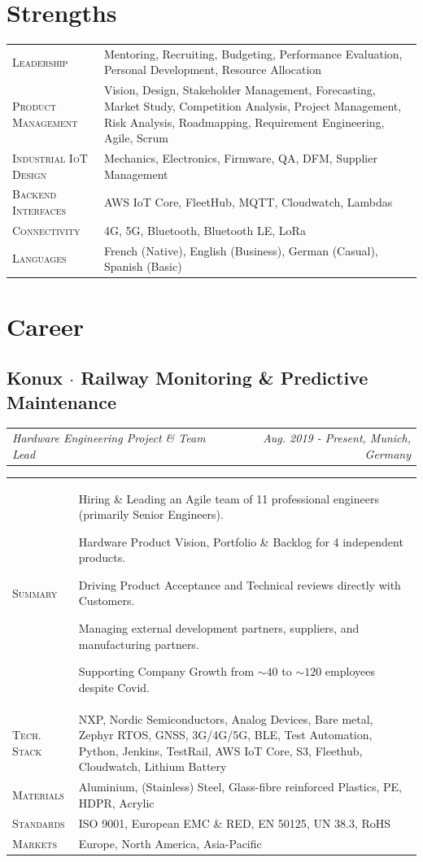 \documentclass[10pt,a4paper]{moderncv}
\newcommand*{\makecareersubsection}[5]{
    \subsection{#1 {\color{color2}$\cdot$ #2}}
    \addvspace{-0.5em}
    {\color{color2}
    \begin{tabularx}{\textwidth}{LR}
        {\itshape #3} & {\itshape #4, #5}
    \end{tabularx}}
    \par\addvspace{1em}
    }
\begin{document}
\section{Strengths}

\begin{tabularx}{\textwidth}{>{\scshape}l@{\hskip 3.5mm}L}
    Leadership & Mentoring, Recruiting, Budgeting, Performance Evaluation, Personal Development, Resource Allocation\\
    Product Management & Vision, Design, Stakeholder Management, Forecasting, Market Study, Competition Analysis, Project Management, Risk Analysis, Roadmapping, Requirement Engineering, Agile, Scrum\\
    Industrial IoT Design & Mechanics, Electronics, Firmware, QA, DFM, Supplier Management\\
    Backend Interfaces & AWS IoT Core, FleetHub, MQTT, Cloudwatch,  Lambdas\\
    Connectivity & 4G, 5G, Bluetooth, Bluetooth LE, LoRa\\
    Languages & French (Native), English (Business), German (Casual), Spanish (Basic)
\end{tabularx}

\section{Career}

\makecareersubsection{Konux}{Railway Monitoring \& Predictive Maintenance}{Hardware Engineering Project \& Team Lead}{Aug. 2019 - Present}{Munich, Germany}

    \begin{tabularx}{\textwidth}{>{\scshape}l@{\hskip 3.5mm}L}
        Summary & Hiring \& Leading an Agile team of 11 professional engineers (primarily Senior Engineers).
        \par Hardware Product Vision, Portfolio \& Backlog for 4 independent products.
        \par Driving Product Acceptance and Technical reviews directly with Customers.
        \par Managing external development partners, suppliers, and manufacturing partners.
        \par Supporting Company Growth from $\sim 40$ to $\sim 120$ employees despite Covid.\\
        Tech. Stack & NXP, Nordic Semiconductors, Analog Devices, Bare metal, Zephyr RTOS, GNSS, 3G/4G/5G, BLE, Test Automation, Python, Jenkins, TestRail, AWS IoT Core, S3, Fleethub, Cloudwatch, Lithium Battery\\
        Materials &  Aluminium, (Stainless) Steel, Glass-fibre reinforced Plastics, PE, HDPR, Acrylic\\
        Standards & ISO 9001, European EMC \& RED, EN 50125, UN 38.3, RoHS\\
        Markets & Europe, North America, Asia-Pacific\\
    \end{tabularx}
\end{document}
